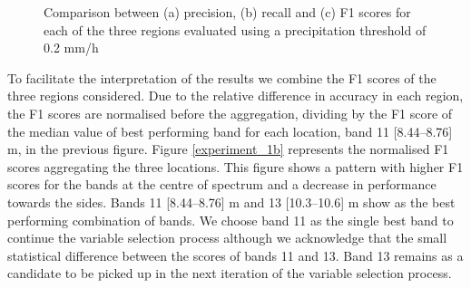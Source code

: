 \documentclass[3p,times]{elsarticle}
\begin{document}
\begin{figure}%
    \centering
    \quad
    
    \caption{Comparison between (a) precision, (b) recall and (c) F1 scores for each of the three regions evaluated using a precipitation threshold of 0.2 mm/h}%
    \label{experiment_1a}%
\end{figure}


To facilitate the interpretation of the results we combine the F1 scores of the three regions considered. Due to the relative difference in accuracy in each region, the F1 scores are normalised before the aggregation, dividing by the F1 score of the median value of best performing band for each location, band 11 [8.44–8.76] \textmu m, in the previous figure. Figure \ref{experiment_1b} represents the normalised F1 scores aggregating the three locations. This figure shows a pattern with higher F1 scores for the bands at the centre of spectrum and a decrease in performance towards the sides. Bands 11 [8.44–8.76] \textmu m and 13 [10.3–10.6] \textmu m show as the best performing combination of bands. We choose band 11 as the single best band to continue the variable selection process although we acknowledge that the small statistical difference between the scores of bands 11 and 13. Band 13 remains as a candidate to be picked up in the next iteration of the variable selection process.
\end{document}
